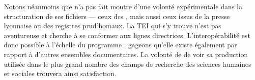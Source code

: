 Notons néanmoins que \timeus{} n'a pas fait montre d'une volonté expérimentale dans la structuration de ses fichiers --- ceux des \odm, mais aussi ceux issus de la presse lyonnaise ou des registres prud'homaux. La TEI qui s'y trouve n'est pas aventureuse et cherche à se conformer aux lignes directrices. L'interopérabilité est donc possible à l'échelle du programme : gageons qu'elle existe également par rapport à d'autres ensembles documentaires. La volonté de \timeus{} de voir sa production utilisée dans le plus grand nombre des champs de recherche des sciences humaines et sociales trouvera ainsi satisfaction.

\newpage
\thispagestyle{empty}
\mbox{}
\newpage